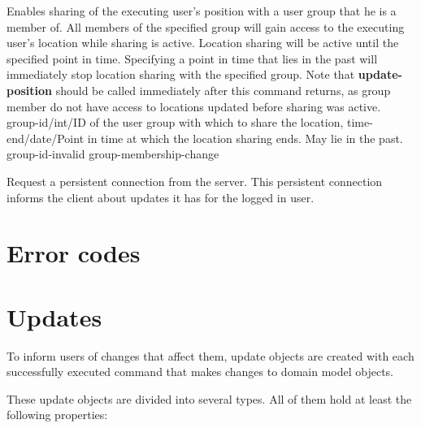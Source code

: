 \documentclass[parskip=full,11pt]{scrartcl}
\begin{document}
{Enables sharing of the executing user's position with a user group that he is
a member of.
All members of the specified group will gain access to the executing user's
location while sharing is active.
Location sharing will be active until the specified point in time.
Specifying a point in time that lies in the past will immediately stop location
sharing with the specified group.
Note that \textbf{update-position} should be called immediately after this
command returns, as group member do not have access to locations updated before
sharing was active.
}
{group-id/int/ID of the user group with which to share the location,
time-end/date/Point in time at which the location sharing ends.
May lie in the past.}
{}
{group-id-invalid}
{group-membership-change}

{Request a persistent connection from the server. This persistent connection
informs the client about updates it has for the logged in user.}
{}
{}
{}
{}


\section{Error codes}\label{sec:errorcodes}
\apiErrorTable

\section{Updates}
To inform users of changes that affect them, update objects are created with
each successfully executed command that makes changes to domain model objects.

These update objects are divided into several types. All of them hold at least
the following properties:



\end{document}
